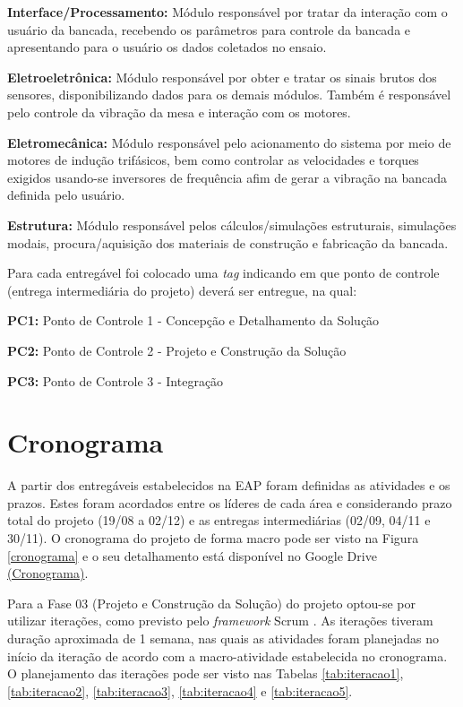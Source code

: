 \textbf{Interface/Processamento:} Módulo responsável por tratar da interação com o usuário da bancada, recebendo os parâmetros para controle da bancada e apresentando para o usuário os dados coletados no ensaio.

\textbf{Eletroeletrônica:} Módulo responsável por obter e tratar os sinais brutos dos sensores, disponibilizando dados para os demais módulos. Também é responsável pelo controle da vibração da mesa e interação com os motores.

\textbf{Eletromecânica:} Módulo responsável pelo acionamento do sistema por meio de motores de indução trifásicos, bem como controlar as velocidades e torques exigidos usando-se inversores de frequência afim de gerar a vibração na bancada definida pelo usuário.

\textbf{Estrutura:} Módulo responsável pelos cálculos/simulações estruturais, simulações modais, procura/aquisição dos materiais de construção e fabricação da bancada.

Para cada entregável foi colocado uma \textit{tag} indicando em que ponto de controle (entrega intermediária do projeto) deverá ser entregue, na qual:

\indent \textbf{PC1:} Ponto de Controle 1 - Concepção e Detalhamento da Solução

\indent \textbf{PC2:} Ponto de Controle 2 - Projeto e Construção da Solução

\indent \textbf{PC3:} Ponto de Controle 3 - Integração

\section*{Cronograma}

A partir dos entregáveis estabelecidos na EAP foram definidas as atividades e os prazos. Estes foram acordados entre os líderes de
cada área e considerando prazo total do projeto (19/08 a 02/12) e as entregas intermediárias (02/09, 04/11 e 30/11).
O cronograma do projeto de forma macro pode ser visto na Figura \ref{cronograma} e o seu detalhamento está disponível
no Google Drive \href{https://drive.google.com/file/d/0B28JW3Vcm0jLdElSSGNPcU4yVEU/view?usp=sharing}{(Cronograma)}.

Para a Fase 03 (Projeto e Construção da Solução) do projeto optou-se por utilizar iterações, como previsto pelo
\textit{framework} Scrum \cite{scrum}.
As iterações tiveram duração aproximada de 1 semana,
nas quais as atividades foram planejadas no início da iteração de acordo
com a macro-atividade estabelecida no cronograma. O planejamento das iterações pode ser visto nas Tabelas \ref{tab:iteracao1},
\ref{tab:iteracao2}, \ref{tab:iteracao3}, \ref{tab:iteracao4} e \ref{tab:iteracao5}.

